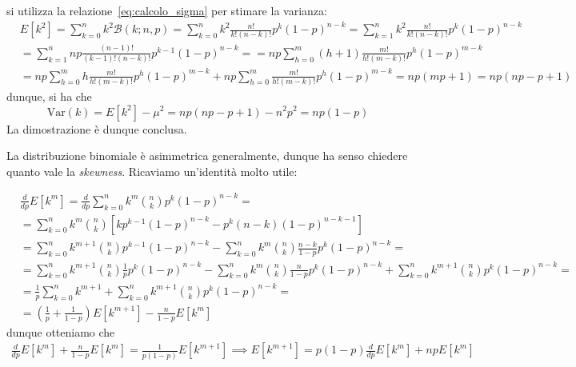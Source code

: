 \documentclass{report}
\begin{document}
\begin{myproof}
si utilizza la relazione~\ref{eq:calcolo_sigma} per stimare la varianza:
\begin{align*}
&E[k^2] = \sum_{k=0}^n k^2 \mathcal{B}(k;n,p) = \sum_{k=0}^n k^2 \frac{n!}{k!(n-k)!}p^k (1-p)^{n-k} = \sum_{k=1}^n k^2 \frac{n!}{k!(n-k)!}p^k (1-p)^{n-k} \\
&= \sum_{k=1}^n np \frac{(n-1)!}{(k-1)!(n-k)!}p^{k-1}(1-p)^{n-k} = = np\sum_{h=0}^m (h+1)\frac{m!}{h!(m-k)!}p^{h}(1-p)^{m-k} \\
&= np \sum_{h=0}^m h\frac{m!}{h!(m-k)!}p^h (1-p)^{m-k} + np\sum_{h=0}^m \frac{m!}{h!(m-k)!}p^h (1-p)^{m-k} = np(mp + 1) = np(np-p+1)
\end{align*}
dunque, si ha che
$$
\text{Var}(k) = E[k^2]-\mu^2 = np(np-p+1) - n^2p^2 = np(1-p)
$$
La dimostrazione è dunque conclusa.
\end{myproof}
La distribuzione binomiale è asimmetrica generalmente, dunque ha senso chiedere quanto vale la \emph{skewness}. Ricaviamo un'identità molto utile:
\begin{myproof}
	\begin{align*}	
	&\frac{d}{dp} E[k^m] = \frac{d}{dp} \sum_{k=0}^n k^m \binom{n}{k}p^k(1-p)^{n-k} = \\
	&=\sum_{k=0}^n k^m \binom{n}{k} \left[ kp^{k-1} (1-p)^{n-k} - p^{k}(n-k)(1-p)^{n-k-1} \right] \\
	&= \sum_{k=0}^n k^{m+1} \binom{n}{k} p^{k-1}(1-p)^{n-k} - \sum_{k=0}^n k^{m} \binom{n}{k} \frac{n-k}{1-p}p^k(1-p)^{n-k} = \\ 
	&= \sum_{k=0}^n k^{m+1} \binom{n}{k} \frac{1}{p} p^{k}(1-p)^{n-k} - \sum_{k=0}^n k^{m} \binom{n}{k} \frac{n}{1-p} p^k(1-p)^{n-k} + \sum_{k=0}^n k^{m+1} \binom{n}{k} p^k(1-p)^{n-k}	= \\
	&= \frac{1}{p} \sum_{k=0}^n k^{m+1} + \sum_{k=0}^n k^{m+1}\binom{n}{k}p^k (1-p)^{n-k} = \\
	&= (\frac{1}{p} + \frac{1}{1-p})E[k^{m+1}] -\frac{n}{1-p}E[k^m]
	\end{align*}
	dunque otteniamo che
	\begin{align*}
	\frac{d}{dp}E[k^m] + \frac{n}{1-p}E[k^m] = \frac{1}{p(1-p)}E[k^{m+1}] \implies E[k^{m+1}] = p(1-p)\frac{d}{dp} E[k^m] + npE[k^m]
	\end{align*}
\end{myproof}
\end{document}
